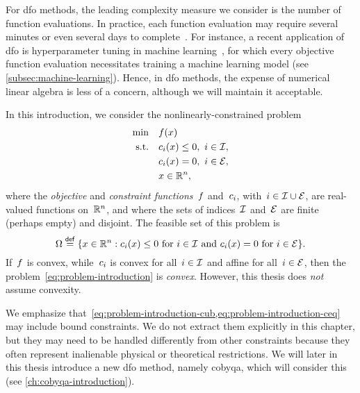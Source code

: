 For \gls{dfo} methods, the leading complexity measure we consider is the number of function evaluations.
In practice, each function evaluation may require several minutes or even several days to complete~\cite[\S~1.4]{Audet_Hare_2017}.
For instance, a recent application of \gls{dfo} is hyperparameter tuning in machine learning~\cite{Ghanbari_Scheinberg_2017}, for which every objective function evaluation necessitates training a machine learning model (see \cref{subsec:machine-learning}).
Hence, in \gls{dfo} methods, the expense of numerical linear algebra is less of a concern, although we will maintain it acceptable.

In this introduction, we consider the nonlinearly-constrained problem
\begin{subequations}
    \label{eq:problem-introduction}
    \begin{align}
        \min        & \quad \obj(\iter)\\
        \text{s.t.} & \quad \con{i}(\iter) \le 0, ~ i \in \iub, \label{eq:problem-introduction-cub}\\
                    & \quad \con{i}(\iter) = 0, ~ i \in \ieq, \label{eq:problem-introduction-ceq}\\
                    & \quad \iter \in \R^n, \nonumber
    \end{align}
\end{subequations}
where the \emph{objective} and \emph{constraint functions}~$f$ and~$c_{i}$, with~$i \in \mathcal{I} \cup \mathcal{E}$, are real-valued functions on~$\mathbb{R}^n$, and where the sets of indices~$\mathcal{I}$ and~$\mathcal{E}$ are finite (perhaps empty) and disjoint.
The feasible set of this problem is
\begin{equation*}
    \fset \eqdef \set{\iter \in \R^n : \text{$\con{i}(\iter) \le 0$ for~$i \in \iub$ and~$\con{i}(\iter) = 0$ for~$i \in \ieq$}}.
\end{equation*}
If~$f$ is convex, while~$c_{i}$ is convex for all~$i \in \mathcal{I}$ and affine for all~$i \in \mathcal{E}$, then the problem~\cref{eq:problem-introduction} is \emph{convex}.
However, this thesis does \emph{not} assume convexity.

We emphasize that~\cref{eq:problem-introduction-cub,eq:problem-introduction-ceq} may include bound constraints.
We do not extract them explicitly in this chapter, but they may need to be handled differently from other constraints because they often represent inalienable physical or theoretical restrictions.
We will later in this thesis introduce a new \gls{dfo} method, namely \gls{cobyqa}, which will consider this (see \cref{ch:cobyqa-introduction}).

